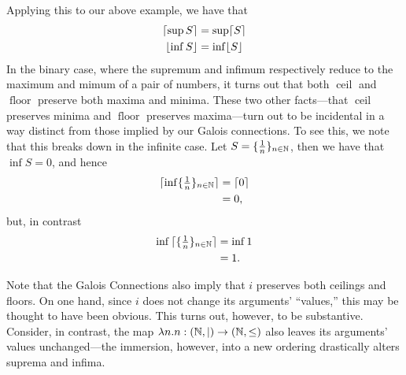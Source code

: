 Applying this to our above example, we have that
\begin{align*}
    \lceil \sup S \rceil &=\sup\lceil S \rceil \\
    \lfloor \inf S \rfloor &=\inf\lfloor S \rfloor 
\end{align*}
In the binary case, where the supremum and infimum respectively reduce to the maximum and mimum of a pair of numbers, it turns out that both $\operatorname{ceil}$ and $\operatorname{floor}$ preserve both maxima and minima. These two other facts---that $\operatorname{ceil}$ preserves minima and $\operatorname{floor}$ preserves maxima---turn out to be incidental in a way distinct from those implied by our Galois connections. To see this, we note that this breaks down in the infinite case. Let $S=\{\frac{1}{n}\}_{n\in\mathbb N}$, then we have that $\inf S = 0$, and hence
\begin{align*}
    \lceil \inf \{\tfrac{1}{n}\}_{n\in\mathbb N} \rceil&= \lceil 0 \rceil \\ &= 0,
\end{align*}
but, in contrast
\begin{align*}
    \inf{\lceil \{\tfrac{1}{n}\}_{n\in\mathbb N} \rceil} &= \inf{1} \\
    &= 1.
\end{align*}

Note that the Galois Connections also imply that $i$ preserves both ceilings and floors. On one hand, since $i$ does not change its arguments' ``values,'' this may be thought to have been obvious. This turns out, however, to be substantive. Consider, in contrast, the map $\lambda n.n:(\mathbb N,|)\to(\mathbb N,\leq)$ also leaves its arguments' values unchanged---the immersion, however, into a new ordering drastically alters suprema and infima.

